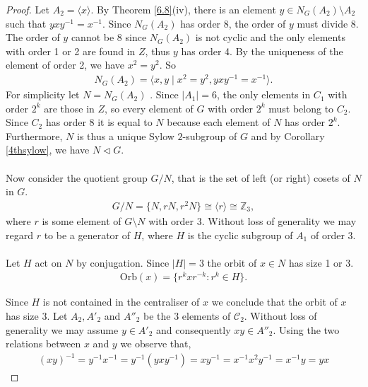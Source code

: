 \begin{proof}
Let $A_2 = \langle x \rangle$. By Theorem \ref{6.8}(iv), there is an element $y \in N_G(A_2) \! \setminus \! A_2$ such that $y x y^{-1} = x^{-1}$. Since $N_G(A_2)$ has order 8, the order of $y$ must divide 8. The order of $y$ cannot be 8 since $N_G(A_2)$ is not cyclic and the only elements with order 1 or 2  are found in $Z$, thus $y$ has order 4. By the uniqueness of the element of order 2, we have $x^2 = y^2$. So
\begin{align*} N_G(A_2) = \langle x, y \; | \; x^2 = y^2, y x y^{-1} = x^{-1} \rangle.
\end{align*}
For simplicity let $N = N_G(A_2)$ . Since $|A_1| = 6$, the only elements in $C_1$ with order $2^k$ are those in $Z$, so every element of $G$ with order $2^k$ must belong to $C_2$. Since $C_2$ has order 8 it is equal to $N$ because each element of $N$ has order $2^k$. Furthermore, $N$ is thus a unique Sylow $2$-subgroup of $G$ and by Corollary \ref{4thsylow}, we have $N \vartriangleleft G$. \\
\\
Now consider the quotient group $G / N$, that is the set of left (or right) cosets of $N$ in $G$.
\begin {align*} G / N = \{ N, rN, r^2N \} \cong \langle r \rangle \cong \mathbb{Z}_3,
\end{align*}
where $r$ is some element of $G\! \setminus \! N$ with order 3. Without loss of generality we may regard $r$ to be a generator of $H$, where $H$ is the cyclic subgroup of $A_1$ of order 3. \\
\\
Let $H$ act on $N$ by conjugation. Since $|H| = 3$ the orbit of $x \in N$ has size 1 or 3.
\begin{align*} \text{Orb}(x) =  \{ r^k x r^{-k} : r^k \in H \}.
\end{align*}

Since $H$ is not contained in the centraliser of $x$ we conclude that the orbit of $x$ has size 3. Let $A_2, A'_2$ and $A''_2$ be the 3 elements of $\mathcal{C}_2$. Without loss of generality we may assume $y \in A'_2$ and consequently $xy \in A''_2$. Using the two relations between $x$ and $y$ we observe that,
\begin{align*} (xy)^{-1} = y^{-1} x^{-1} = y^{-1} (y x y^{-1}) = x y^{-1} = x^{-1} x^2 y^{-1} = x^{-1} y = yx
\end{align*}



\end{proof}
